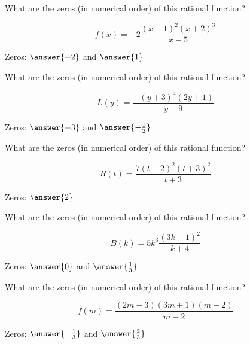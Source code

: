 \documentclass{ximera}
\author{Lee Wayand}
\begin{document}
\begin{example}








\begin{question}


What are the zeros (in numerical order) of this rational function?

\[
f(x) = -2\frac{(x-1)^2(x+2)^3}{x-5}
\]


Zeros:  $\answer{-2}$ and $\answer{1}$

\end{question}





\begin{question}


What are the zeros (in numerical order) of this rational function?

\[
L(y) = \frac{-(y+3)^4(2y+1)}{y+9}
\]

Zeros:  $\answer{-3}$ and $\answer{-\frac{1}{2}}$

\end{question}





\begin{question}


What are the zeros (in numerical order) of this rational function?

\[
R(t) = \frac{7(t-2)^2(t+3)^2}{t+3}
\]

Zeros:  $\answer{2}$

\end{question}





\begin{question}


What are the zeros (in numerical order) of this rational function?

\[
B(k) =  5k^3 \frac{(3k - 1)^2}{k+4}
\]

Zeros:  $\answer{0}$ and $\answer{\frac{1}{3}}$

\end{question}








\begin{question}


What are the zeros (in numerical order) of this rational function?

\[
f(m) = \frac{(2m - 3)(3m + 1)(m-2)}{m-2}
\]

Zeros:  $\answer{-\frac{1}{3}}$ and $\answer{\frac{2}{3}}$

\end{question}












\end{example}
\end{document}

